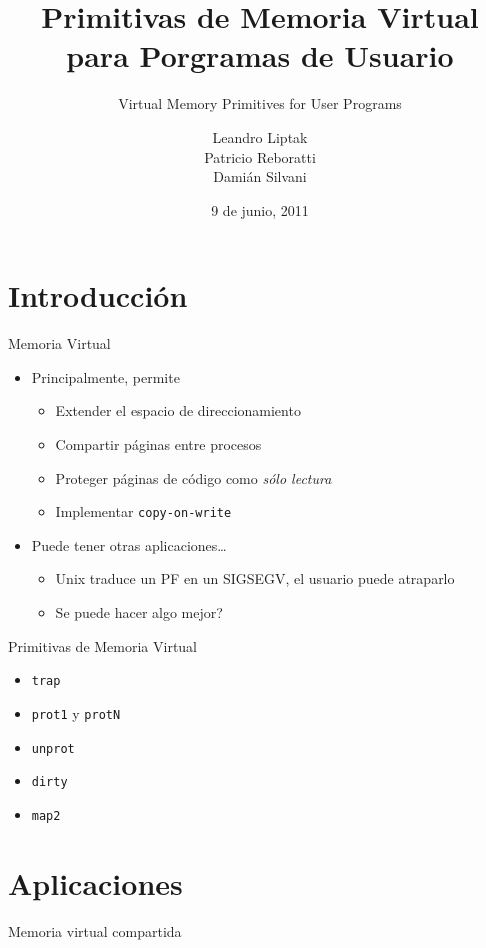 \documentclass[xcolor=pdftex,dvipsnames,usenames,table]{beamer}
\title[]
{Primitivas de Memoria Virtual para Porgramas de Usuario}
\subtitle
{Virtual Memory Primitives for User Programs}
\author[]
{
	Leandro Liptak\\
	Patricio Reboratti\\
	Damián Silvani
}
\institute[UBA]
{
  Programación de Sistemas Operativos\\
  Universidad de Buenos Aires
}
\date
{9 de junio, 2011}
\begin{document}
\begin{frame}
  \titlepage
\end{frame}

\section{Introducción}

\begin{frame}{Memoria Virtual}
  \begin{itemize}
    \item Principalmente, permite
      \begin{itemize}
        \item Extender el espacio de direccionamiento
        \item Compartir páginas entre procesos
        \item Proteger páginas de código como \textit{sólo lectura}
        \item Implementar \texttt{copy-on-write}
      \end{itemize}

    \item Puede tener otras aplicaciones\ldots
    \begin{itemize}
      \item Unix traduce un PF en un SIGSEGV, el usuario puede atraparlo
      \item Se puede hacer algo mejor?
    \end{itemize}
 \end{itemize}
\end{frame}

\begin{frame}{Primitivas de Memoria Virtual}
  
  \begin{itemize}
    \item \texttt{trap}
    \item \texttt{prot1} y \texttt{protN}
    \item \texttt{unprot}
    \item \texttt{dirty}
    \item \texttt{map2}
  \end{itemize}
\end{frame}

\section{Aplicaciones}

\begin{frame}{Memoria virtual compartida}
\end{frame}
\end{document}
